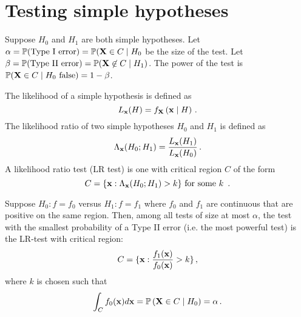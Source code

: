 \section{Testing simple hypotheses}

Suppose $H_0$ and $H_1$ are both simple hypotheses.
Let $\alpha = \mathbb{P}(\text{Type I error}) = \mathbb{P}(\mathbf{X} \in C \mid H_0$ be the size of the test.
Let $\beta = \mathbb{P}(\text{Type II error}) = \mathbb{P}(\mathbf{X} \not\in C \mid H_1)$.
The power of the test is $\mathbb{P}(\mathbf{X} \in C \mid H_0 \text{ false}) = 1 - \beta$.

The likelihood of a simple hypothesis is defined as
\[
L_{\mathbf{x}} (H) = f_{\mathbf{X}} \left( \mathbf{x} \mid H \right) \, {.}
\]
The likelihood ratio of two simple hypotheses $H_0$ and $H_1$ is defined as
\[
\Lambda_{\mathbf{x}} (H_0; H_1) = \frac{L_{\mathbf{x}}(H_1)}{L_{\mathbf{x}}(H_0)} \, {.}
\]
A likelihood ratio test (LR test) is one with critical region $C$ of the form
\[
C = \{ \mathbf{x} : \Lambda_{\mathbf{x}}(H_0; H_1) > k \} \text{ for some $k$ }\, {.}
\]

\begin{theorem}[name=Neyman-Pearson lemma,label=thm:np]
Suppose $H_0 : f = f_0$ versus $H_1 : f = f_1$ where $f_0$ and $f_1$ are continuous \pdfs that are positive on the same region.
Then, among all tests of size at most $\alpha$, the test with the smallest probability of a Type II error (i.e. the most powerful test) is the LR-test with critical region:
\[
C = \{ \mathbf{x} : \frac{f_1(\mathbf{x})}{f_0(\mathbf{x})} > k \} \, {,}
\]
where $k$ is chosen such that
\[
\int_C f_0(\mathbf{x}) d\mathbf{x} = \mathbb{P} \left(\mathbf{X} \in C \mid H_0\right) = \alpha \, {.}
\]
\end{theorem}

